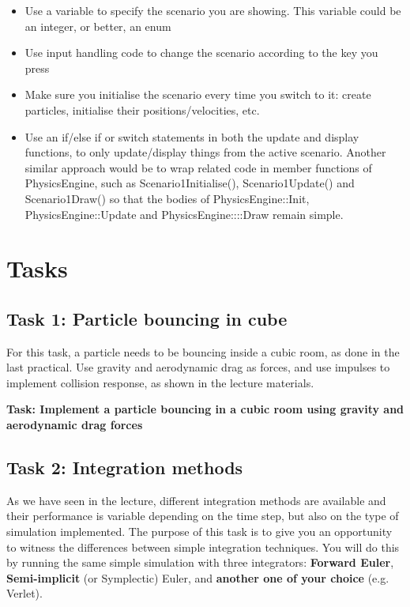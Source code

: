 \documentclass[12pt]{article}
\begin{document}
\begin{itemize}
\item Use a variable to specify the scenario you are showing. This variable could be an integer, or better, an enum
\item Use input handling code to change the scenario according to the key you press
\item Make sure you initialise the scenario every time you switch to it: create particles, initialise their positions/velocities, etc.
\item Use an if/else if or switch statements in both the update and display functions, to only update/display things from the active scenario. Another similar approach would be to wrap related code in member functions of PhysicsEngine, such as Scenario1Initialise(), Scenario1Update() and Scenario1Draw() so that the bodies of PhysicsEngine::Init, PhysicsEngine::Update and PhysicsEngine::::Draw remain simple. 
\end{itemize}

\section*{Tasks}

\subsection*{Task 1: Particle bouncing in cube}

For this task, a particle needs to be bouncing inside a cubic room, as done in the last practical. Use gravity and aerodynamic drag as forces, and use impulses to implement collision response, as shown in the lecture materials. 

\textbf{Task: Implement a particle bouncing in a cubic room using gravity and aerodynamic drag forces}

\subsection*{Task 2: Integration methods}

As we have seen in the lecture, different integration methods are available and their performance is variable depending on the time step, but also on the type of simulation implemented. The purpose of this task is to give you an opportunity to witness the differences between simple integration techniques. You will do this by running the same simple simulation with three integrators: \textbf{Forward Euler}, \textbf{Semi-implicit} (or Symplectic) Euler, and \textbf{another one of your choice} (e.g. Verlet).
\end{document}
